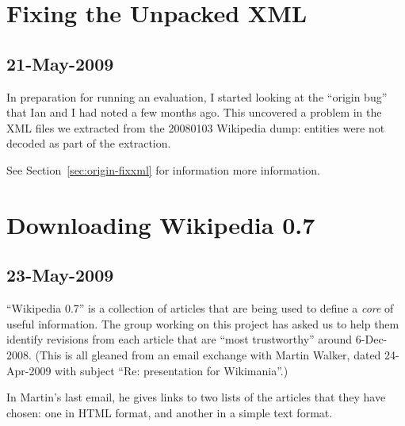 \section{Fixing the Unpacked XML}

\subsection{21-May-2009}

In preparation for running an evaluation, I started looking
at the ``origin bug'' that Ian and I had noted a few months ago.
This uncovered a problem in the XML files we extracted from
the 20080103 Wikipedia dump: entities were not decoded as
part of the extraction.

See Section~\ref{sec:origin-fixxml} for information more information.

\section{Downloading Wikipedia 0.7}

\subsection{23-May-2009}

``Wikipedia 0.7'' is a collection of articles that are being used
to define a \textit{core} of useful information.
The group working on this project has asked us to help them
identify revisions from each article that are ``most trustworthy''
around 6-Dec-2008.
(This is all gleaned from an email exchange with
Martin Walker, dated 24-Apr-2009 with
subject ``Re: presentation for Wikimania''.)

In Martin's last email, he gives links to two lists of
the articles that they have chosen: one in HTML format,
and another in a simple text format.

